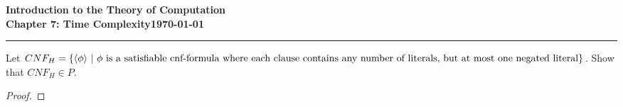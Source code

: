 \documentclass[11pt]{article}
\newcommand{\dated}{\today}
\begin{document}
\textbf{Introduction to the Theory of
Computation}\hfill\textbf{\myname}\\[0.01in]
\textbf{Chapter 7: Time Complexity}\hfill\textbf{\dated}\\
\smallskip\hrule\bigskip

\begin{problem}{7.25}
Let $CNF_H = \{\langle \phi \rangle \ | \ \phi \text{ is a satisfiable cnf-formula where each clause contains } \\ \text{any number of literals, but at most one negated literal}\}$. Show that $CNF_H \in P$.
\end{problem}

\begin{proof}
\end{proof}
\end{document}
